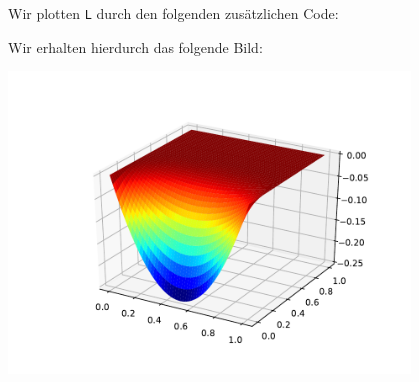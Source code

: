 \section{}



\subsection{}

Wir plotten \texttt{L} durch den folgenden zusätzlichen Code:



Wir erhalten hierdurch das folgende Bild:

\begin{center}
  \includegraphics[width = 0.8\textwidth]{chapter_04/exercise_04_23_figure_1.pdf}
\end{center}



\subsection{}

